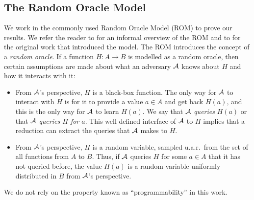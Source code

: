 \subsection{The Random Oracle Model} \label{sec:rom}

We work in the commonly used Random Oracle Model (ROM) to prove our results. We refer the reader to \cite[Chapter 6.5]{introduction-to-modern-cryptography} for an informal overview of the ROM and to \cite{rom} for the original work that introduced the model. The ROM introduces the concept of a \emph{random oracle}. If a function $H : A \to B$ is modelled as a random oracle, then certain assumptions are made about what an adversary $\mathcal{A}$ knows about $H$ and how it interacts with it:
\begin{itemize}
	\item From $\mathcal{A}$'s perspective, $H$ is a black-box function. The only way for $\mathcal{A}$ to interact with $H$ is for it to provide a value $a \in A$ and get back $H(a)$, and this is the only way for $\mathcal{A}$ to learn $H(a)$. We say that $\mathcal{A}$ \emph{queries} $H(a)$ or that $\mathcal{A}$ \emph{queries $H$ for $a$}. This well-defined interface of $\mathcal{A}$ to $H$ implies that a reduction can extract the queries that $\mathcal{A}$ makes to $H$.
	\item From $\mathcal{A}$'s perspective, $H$ is a random variable, sampled u.a.r.\ from the set of all functions from $A$ to $B$. Thus, if $\mathcal{A}$ queries $H$ for some $a \in A$ that it has not queried before, the value $H(a)$ is a random variable uniformly distributed in $B$ from $\mathcal{A}$'s perspective.
\end{itemize}
We do not rely on the property known as ``programmability'' in this work.
